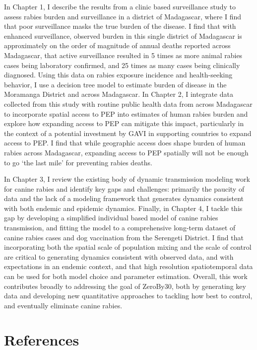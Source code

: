 \documentclass[
  oneside]{book}
\begin{document}
In Chapter 1, I describe the results from a clinic based surveillance study to assess rabies burden and surveillance in a district of Madagascar, where I find that poor surveillance masks the true burden of the disease. I find that with enhanced surveillance, observed burden in this single district of Madagascar is approximately on the order of magnitude of annual deaths reported across Madagascar, that active surveillance resulted in 5 times as more animal rabies cases being laboratory confirmed, and 25 times as many cases being clinically diagnosed. Using this data on rabies exposure incidence and health-seeking behavior, I use a decision tree model to estimate burden of disease in the Moramanga District and across Madagascar. In Chapter 2, I integrate data collected from this study with routine public health data from across Madagascar to incorporate spatial access to PEP into estimates of human rabies burden and explore how expanding access to PEP can mitigate this impact, particularly in the context of a potential investment by GAVI in supporting countries to expand access to PEP. I find that while geographic access does shape burden of human rabies across Madagascar, expanding access to PEP spatially will not be enough to go `the last mile' for preventing rabies deaths.

In Chapter 3, I review the existing body of dynamic transmission modeling work for canine rabies and identify key gaps and challenges: primarily the paucity of data and the lack of a modeling framework that generates dynamics consistent with both endemic and epidemic dynamics. Finally, in Chapter 4, I tackle this gap by developing a simplified individual based model of canine rabies transmission, and fitting the model to a comprehensive long-term dataset of canine rabies cases and dog vaccination from the Serengeti District. I find that incorporating both the spatial scale of population mixing and the scale of control are critical to generating dynamics consistent with observed data, and with expectations in an endemic context, and that high resolution spatiotemporal data can be used for both model choice and parameter estimation. Overall, this work contributes broadly to addressing the goal of ZeroBy30, both by generating key data and developing new quantitative approaches to tackling how best to control, and eventually eliminate canine rabies.

\hypertarget{references}{%
\section*{References}\label{references}}
\end{document}
